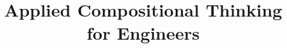 \documentclass[paper=6in:9in,pagesize=pdftex,
 headinclude=off,footinclude=on,11pt,twoside]{scrbook}
\begin{document}
\title{Applied Compositional Thinking\\ for Engineers}
\date{} 


  


\end{document}
